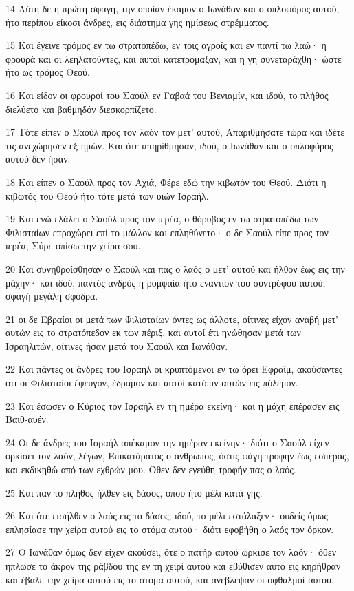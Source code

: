 \par 14 Αύτη δε η πρώτη σφαγή, την οποίαν έκαμον ο Ιωνάθαν και ο οπλοφόρος αυτού, ήτο περίπου είκοσι άνδρες, εις διάστημα γης ημίσεως στρέμματος.
\par 15 Και έγεινε τρόμος εν τω στρατοπέδω, εν τοις αγροίς και εν παντί τω λαώ· η φρουρά και οι λεηλατούντες, και αυτοί κατετρόμαξαν, και η γη συνεταράχθη· ώστε ήτο ως τρόμος Θεού.
\par 16 Και είδον οι φρουροί του Σαούλ εν Γαβαά του Βενιαμίν, και ιδού, το πλήθος διελύετο και βαθμηδόν διεσκορπίζετο.
\par 17 Τότε είπεν ο Σαούλ προς τον λαόν τον μετ' αυτού, Απαριθμήσατε τώρα και ιδέτε τις ανεχώρησεν εξ ημών. Και ότε απηρίθμησαν, ιδού, ο Ιωνάθαν και ο οπλοφόρος αυτού δεν ήσαν.
\par 18 Και είπεν ο Σαούλ προς τον Αχιά, Φέρε εδώ την κιβωτόν του Θεού. Διότι η κιβωτός του Θεού ήτο τότε μετά των υιών Ισραήλ.
\par 19 Και ενώ ελάλει ο Σαούλ προς τον ιερέα, ο θόρυβος εν τω στρατοπέδω των Φιλισταίων επροχώρει επί το μάλλον και επληθύνετο· ο δε Σαούλ είπε προς τον ιερέα, Σύρε οπίσω την χείρα σου.
\par 20 Και συνηθροίσθησαν ο Σαούλ και πας ο λαός ο μετ' αυτού και ήλθον έως εις την μάχην· και ιδού, παντός ανδρός η ρομφαία ήτο εναντίον του συντρόφου αυτού, σφαγή μεγάλη σφόδρα.
\par 21 οι δε Εβραίοι οι μετά των Φιλισταίων όντες ως άλλοτε, οίτινες είχον αναβή μετ' αυτών εις το στρατόπεδον εκ των πέριξ, και αυτοί έτι ηνώθησαν μετά των Ισραηλιτών, οίτινες ήσαν μετά του Σαούλ και Ιωνάθαν.
\par 22 Και πάντες οι άνδρες του Ισραήλ οι κρυπτόμενοι εν τω όρει Εφραΐμ, ακούσαντες ότι οι Φιλισταίοι έφευγον, έδραμον και αυτοί κατόπιν αυτών εις πόλεμον.
\par 23 Και έσωσεν ο Κύριος τον Ισραήλ εν τη ημέρα εκείνη· και η μάχη επέρασεν εις Βαιθ-αυέν.
\par 24 Οι δε άνδρες του Ισραήλ απέκαμον την ημέραν εκείνην· διότι ο Σαούλ είχεν ορκίσει τον λαόν, λέγων, Επικατάρατος ο άνθρωπος, όστις φάγη τροφήν έως εσπέρας, και εκδικηθώ από των εχθρών μου. Όθεν δεν εγεύθη τροφήν πας ο λαός.
\par 25 Και παν το πλήθος ήλθεν εις δάσος, όπου ήτο μέλι κατά γης.
\par 26 Και ότε εισήλθεν ο λαός εις το δάσος, ιδού, το μέλι εστάλαξεν· ουδείς όμως επλησίασε την χείρα αυτού εις το στόμα αυτού· διότι εφοβήθη ο λαός τον όρκον.
\par 27 Ο Ιωνάθαν όμως δεν είχεν ακούσει, ότε ο πατήρ αυτού ώρκισε τον λαόν· όθεν ήπλωσε το άκρον της ράβδου της εν τη χειρί αυτού και εβύθισεν αυτό εις κηρήθραν και έβαλε την χείρα αυτού εις το στόμα αυτού, και ανέβλεψαν οι οφθαλμοί αυτού.
